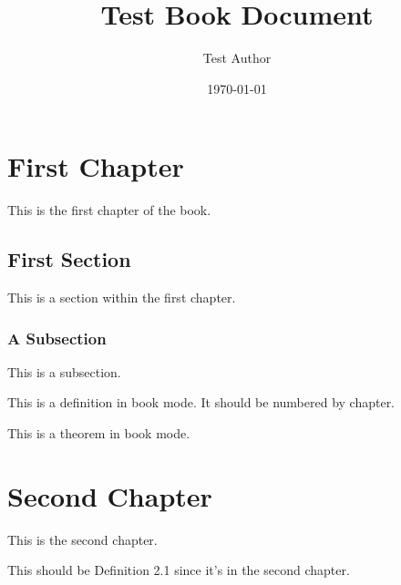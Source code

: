 \documentclass[sectionlevel=book]{noteformyself}
\title{Test Book Document}
\author{Test Author}
\date{\today}
\begin{document}
\maketitle

\chapter{First Chapter}
This is the first chapter of the book.

\section{First Section}
This is a section within the first chapter.

\subsection{A Subsection}
This is a subsection.

\begin{definition}
This is a definition in book mode. It should be numbered by chapter.
\end{definition}

\begin{theorem}
This is a theorem in book mode.
\end{theorem}

\chapter{Second Chapter}
This is the second chapter.

\begin{definition}
This should be Definition 2.1 since it's in the second chapter.
\end{definition}
\end{document}
